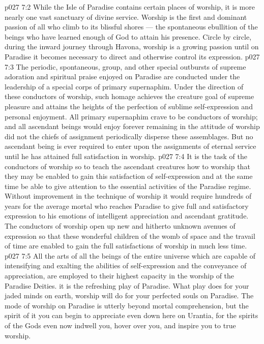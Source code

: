 \vs p027 7:2 \pc While the Isle of Paradise contains certain places of worship, it is more nearly one vast sanctuary of divine service. Worship is the first and dominant passion of all who climb to its blissful shores --- the spontaneous ebullition of the beings who have learned enough of God to attain his presence. Circle by circle, during the inward journey through Havona, worship is a growing passion until on Paradise it becomes necessary to direct and otherwise control its expression.
\vs p027 7:3 The periodic, spontaneous, group, and other special outbursts of supreme adoration and spiritual praise enjoyed on Paradise are conducted under the leadership of a special corps of primary supernaphim. Under the direction of these conductors of worship, such homage achieves the creature goal of supreme pleasure and attains the heights of the perfection of sublime self\hyp{}expression and personal enjoyment. All primary supernaphim crave to be conductors of worship; and all ascendant beings would enjoy forever remaining in the attitude of worship did not the chiefs of assignment periodically disperse these assemblages. But no ascendant being is ever required to enter upon the assignments of eternal service until he has attained full satisfaction in worship.
\vs p027 7:4 \pc It is the task of the conductors of worship so to teach the ascendant creatures how to worship that they may be enabled to gain this satisfaction of self\hyp{}expression and at the same time be able to give attention to the essential activities of the Paradise regime. Without improvement in the technique of worship it would require hundreds of years for the average mortal who reaches Paradise to give full and satisfactory expression to his emotions of intelligent appreciation and ascendant gratitude. The conductors of worship open up new and hitherto unknown avenues of expression so that these wonderful children of the womb of space and the travail of time are enabled to gain the full satisfactions of worship in much less time.
\vs p027 7:5 All the arts of all the beings of the entire universe which are capable of intensifying and exalting the abilities of self\hyp{}expression and the conveyance of appreciation, are employed to their highest capacity in the worship of the Paradise Deities.  it is the refreshing play of Paradise. What play does for your jaded minds on earth, worship will do for your perfected souls on Paradise. The mode of worship on Paradise is utterly beyond mortal comprehension, but the spirit of it you can begin to appreciate even down here on Urantia, for the spirits of the Gods even now indwell you, hover over you, and inspire you to true worship.

